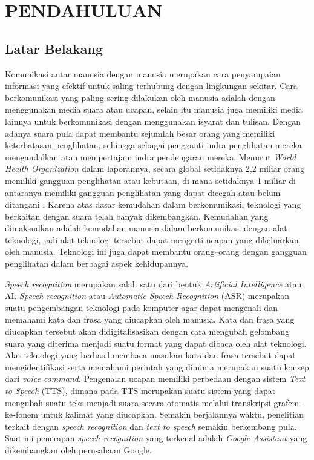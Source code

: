 \fancyhf{} 
\fancyfoot[C]{\thepage}

\chapter{PENDAHULUAN}

\section{Latar Belakang}
Komunikasi antar manusia dengan manusia merupakan cara penyampaian informasi yang efektif untuk saling terhubung dengan lingkungan sekitar. Cara berkomunikasi yang paling sering dilakukan oleh manusia adalah dengan menggunakan media suara atau ucapan, selain itu manusia juga memiliki media lainnya untuk berkomunikasi dengan menggunakan isyarat dan tulisan. Dengan adanya suara pula dapat membantu sejumlah besar orang yang memiliki keterbatasan penglihatan, sehingga sebagai pengganti indra penglihatan mereka mengandalkan atau mempertajam indra pendengaran mereka. Menurut \textit{World Health Organization} dalam laporannya, secara global setidaknya 2,2 miliar orang memiliki gangguan penglihatan atau kebutaan, di mana setidaknya 1 miliar di antaranya memiliki gangguan penglihatan yang dapat dicegah atau belum ditangani \citep{who2019}. Karena atas dasar kemudahan dalam berkomunikasi, teknologi yang berkaitan dengan suara telah banyak dikembangkan. Kemudahan yang dimaksudkan adalah kemudahan manusia dalam berkomunikasi dengan alat teknologi, jadi alat teknologi tersebut dapat mengerti ucapan yang dikeluarkan oleh manusia. Teknologi ini juga dapat membantu orang–orang dengan gangguan penglihatan dalam berbagai aspek kehidupannya.

\par \textit{Speech recognition} merupakan salah satu dari bentuk \textit{Artificial Intelligence} atau AI. \textit{Speech recognition} atau \textit{Automatic Speech Recognition} (ASR) merupakan suatu pengembangan teknologi pada komputer agar dapat mengenali dan memahami kata dan frasa yang diucapkan oleh manusia. Kata dan frasa yang diucapkan tersebut akan didigitalisasikan dengan cara mengubah gelombang suara yang diterima menjadi suatu format yang dapat dibaca oleh alat teknologi. Alat teknologi yang berhasil membaca masukan kata dan frasa tersebut dapat mengidentifikasi serta memahami perintah yang diminta merupakan suatu konsep dari \textit{voice command}. Pengenalan ucapan memiliki perbedaan dengan sistem \textit{Text to Speech} (TTS), dimana pada TTS merupakan suatu sistem yang dapat mengubah suatu teks menjadi suara secara otomatis melalui transkripsi grafem-ke-fonem untuk kalimat yang diucapkan. Semakin berjalannya waktu, penelitian terkait dengan \textit{speech recognition} dan \textit{text to speech} semakin berkembang pula. Saat ini penerapan \textit{speech recognition} yang terkenal adalah \textit{Google Assistant} yang dikembangkan oleh perusahaan Google. 


